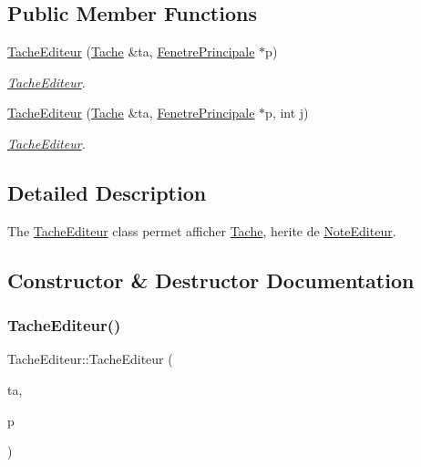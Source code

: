 \subsection*{Public Member Functions}
\begin{DoxyCompactItemize}
\item 
\hyperlink{class_tache_editeur_a5f1d0da8dcde99acf084afb7d8698c14}{Tache\+Editeur} (\hyperlink{class_tache}{Tache} \&ta, \hyperlink{class_fenetre_principale}{Fenetre\+Principale} $\ast$p)
\begin{DoxyCompactList}\small\item\em \hyperlink{class_tache_editeur}{Tache\+Editeur}. \end{DoxyCompactList}\item 
\hyperlink{class_tache_editeur_a6dca52c00766a16c9cf1b44ec210fe31}{Tache\+Editeur} (\hyperlink{class_tache}{Tache} \&ta, \hyperlink{class_fenetre_principale}{Fenetre\+Principale} $\ast$p, int j)
\begin{DoxyCompactList}\small\item\em \hyperlink{class_tache_editeur}{Tache\+Editeur}. \end{DoxyCompactList}\end{DoxyCompactItemize}


\subsection{Detailed Description}
The \hyperlink{class_tache_editeur}{Tache\+Editeur} class permet afficher \hyperlink{class_tache}{Tache}, herite de \hyperlink{class_note_editeur}{Note\+Editeur}. 

\subsection{Constructor \& Destructor Documentation}
\mbox{\label{class_tache_editeur_a5f1d0da8dcde99acf084afb7d8698c14}} 
\subsubsection{\texorpdfstring{Tache\+Editeur()}{TacheEditeur()}\hspace{0.1cm}{\footnotesize\ttfamily [1/2]}}
{\footnotesize\ttfamily Tache\+Editeur\+::\+Tache\+Editeur (\begin{DoxyParamCaption}\item[{\hyperlink{class_tache}{Tache} \&}]{ta,  }\item[{\hyperlink{class_fenetre_principale}{Fenetre\+Principale} $\ast$}]{p }\end{DoxyParamCaption})}



